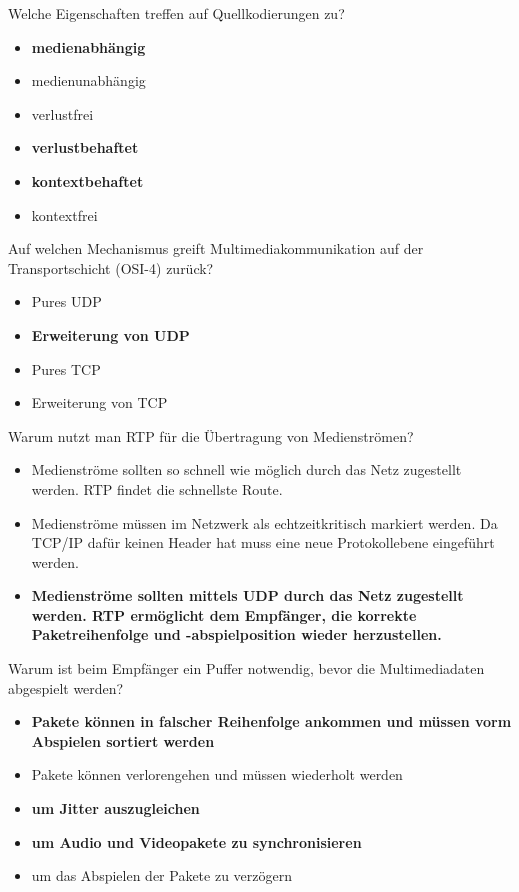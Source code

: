 \documentclass{article}
\begin{document}
	Welche Eigenschaften treffen auf Quellkodierungen zu? 
	\begin{itemize}
		\item \textbf{medienabhängig}
		\item medienunabhängig
		\item verlustfrei
		\item \textbf{verlustbehaftet}
		\item \textbf{kontextbehaftet}
		\item kontextfrei
	\end{itemize}

	Auf welchen Mechanismus greift Multimediakommunikation auf der Transportschicht (OSI-4) zurück? 
	\begin{itemize}
		\item Pures UDP 
		\item \textbf{Erweiterung von UDP}
		\item Pures TCP
		\item Erweiterung von TCP
	\end{itemize}

	Warum nutzt man RTP für die Übertragung von Medienströmen? 
	\begin{itemize}
		\item Medienströme sollten so schnell wie möglich durch das Netz zugestellt werden. RTP findet die schnellste Route. 
		\item Medienströme müssen im Netzwerk als echtzeitkritisch markiert werden. Da TCP/IP dafür keinen Header hat muss eine neue Protokollebene eingeführt werden. 
		\item \textbf{Medienströme sollten mittels UDP durch das Netz zugestellt werden. RTP ermöglicht dem Empfänger, die korrekte Paketreihenfolge und -abspielposition wieder herzustellen. }
	\end{itemize}

	Warum ist beim Empfänger ein Puffer notwendig, bevor die Multimediadaten abgespielt werden? 
	\begin{itemize}
		\item \textbf{Pakete können in falscher Reihenfolge ankommen und müssen vorm Abspielen sortiert werden}
		\item Pakete können verlorengehen und müssen wiederholt werden
		\item \textbf{um Jitter auszugleichen}
		\item \textbf{um Audio und Videopakete zu synchronisieren}
		\item um das Abspielen der Pakete zu verzögern
	\end{itemize}
\end{document}
